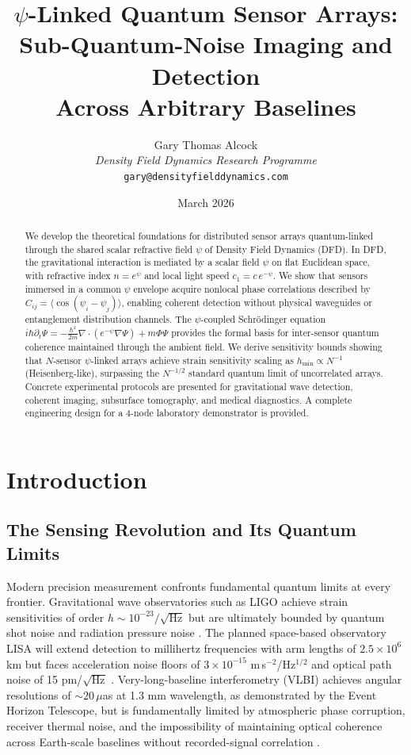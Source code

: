 \documentclass[12pt,a4paper]{article}
\title{\textbf{$\psi$-Linked Quantum Sensor Arrays:\\
Sub-Quantum-Noise Imaging and Detection\\
Across Arbitrary Baselines}}
\author{Gary Thomas Alcock\\
\textit{Density Field Dynamics Research Programme}\\
\texttt{gary@densityfielddynamics.com}}
\date{March 2026}
\theoremstyle{remark}
\begin{document}
\maketitle

\begin{abstract}
We develop the theoretical foundations for distributed sensor arrays
quantum-linked through the shared scalar refractive field $\psi$ of
Density Field Dynamics (DFD). In DFD, the gravitational interaction is
mediated by a scalar field $\psi$ on flat Euclidean space, with refractive
index $n = e^\psi$ and local light speed $c_1 = c\,e^{-\psi}$. We show
that sensors immersed in a common $\psi$ envelope acquire nonlocal phase
correlations described by $C_{ij} = \langle\cos(\psi_i - \psi_j)\rangle$,
enabling coherent detection without physical waveguides or entanglement
distribution channels. The $\psi$-coupled Schr\"odinger equation
$i\hbar\partial_t\Psi = -\frac{\hbar^2}{2m}\nabla\cdot(e^{-\psi}\nabla\Psi) + m\Phi\Psi$
provides the formal basis for inter-sensor quantum coherence maintained
through the ambient field. We derive sensitivity bounds showing that
$N$-sensor $\psi$-linked arrays achieve strain sensitivity scaling as
$h_{\min} \propto N^{-1}$ (Heisenberg-like), surpassing the $N^{-1/2}$
standard quantum limit of uncorrelated arrays. Concrete experimental
protocols are presented for gravitational wave detection, coherent imaging,
subsurface tomography, and medical diagnostics. A complete engineering
design for a 4-node laboratory demonstrator is provided.
\end{abstract}

\tableofcontents
\newpage

\section{Introduction}\label{sec:intro}

\subsection{The Sensing Revolution and Its Quantum Limits}

Modern precision measurement confronts fundamental quantum limits at every
frontier. Gravitational wave observatories such as LIGO achieve strain
sensitivities of order $h \sim 10^{-23}/\sqrt{\text{Hz}}$ but are
ultimately bounded by quantum shot noise and radiation pressure noise
\cite{LIGO2015,Aasi2015}. The planned space-based observatory LISA will
extend detection to millihertz frequencies with arm lengths of $2.5 \times 10^6$ km
but faces acceleration noise floors of $3 \times 10^{-15}$ m\,s$^{-2}$/Hz$^{1/2}$
and optical path noise of 15 pm/$\sqrt{\text{Hz}}$ \cite{LISA2017}.
Very-long-baseline interferometry (VLBI) achieves angular resolutions of
$\sim 20\,\mu$as at 1.3 mm wavelength, as demonstrated by the Event
Horizon Telescope, but is fundamentally limited by atmospheric phase
corruption, receiver thermal noise, and the impossibility of maintaining
optical coherence across Earth-scale baselines without recorded-signal
correlation \cite{EHT2019,Thompson2017}.
\end{document}
